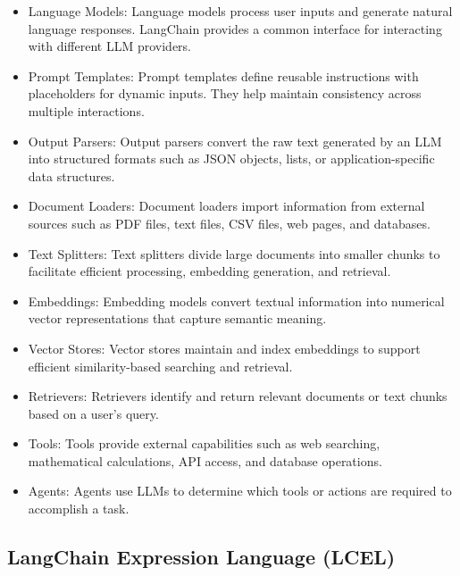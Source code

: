 \begin{itemize}
    \item Language Models: Language models process user inputs and generate natural language responses. LangChain provides a common interface for interacting with different LLM providers.
    
    \item Prompt Templates: Prompt templates define reusable instructions with placeholders for dynamic inputs. They help maintain consistency across multiple interactions.
    
    \item Output Parsers: Output parsers convert the raw text generated by an LLM into structured formats such as JSON objects, lists, or application-specific data structures.
    
    \item Document Loaders: Document loaders import information from external sources such as PDF files, text files, CSV files, web pages, and databases.
    
    \item Text Splitters: Text splitters divide large documents into smaller chunks to facilitate efficient processing, embedding generation, and retrieval.
    
    \item Embeddings: Embedding models convert textual information into numerical vector representations that capture semantic meaning.
    
    \item Vector Stores: Vector stores maintain and index embeddings to support efficient similarity-based searching and retrieval.
    
    \item Retrievers: Retrievers identify and return relevant documents or text chunks based on a user's query.
    
    \item Tools: Tools provide external capabilities such as web searching, mathematical calculations, API access, and database operations.
    
    \item Agents: Agents use LLMs to determine which tools or actions are required to accomplish a task.
\end{itemize}

\subsection{LangChain Expression Language (LCEL)}

